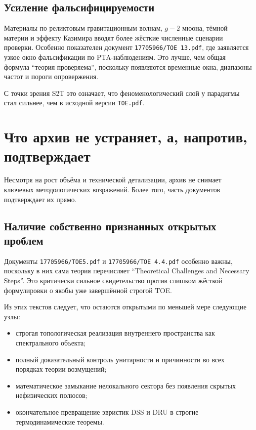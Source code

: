 \documentclass[12pt,a4paper]{article}
\begin{document}
\subsection{Усиление фальсифицируемости}

Материалы по реликтовым гравитационным волнам, \(g-2\) мюона, тёмной материи и эффекту Казимира вводят более жёсткие численные сценарии проверки. Особенно показателен документ \texttt{17705966/ТОЕ 13.pdf}, где заявляется узкое окно фальсификации по PTA-наблюдениям. Это лучше, чем общая формула ``теория проверяема'', поскольку появляются временные окна, диапазоны частот и пороги опровержения.

С точки зрения S2T это означает, что феноменологический слой у парадигмы стал сильнее, чем в исходной версии \texttt{TOE.pdf}.

\section{Что архив не устраняет, а, напротив, подтверждает}

Несмотря на рост объёма и технической детализации, архив не снимает ключевых методологических возражений. Более того, часть документов подтверждает их прямо.

\subsection{Наличие собственно признанных открытых проблем}

Документы \texttt{17705966/TOE5.pdf} и \texttt{17705966/ТОЕ 4.4.pdf} особенно важны, поскольку в них сама теория перечисляет ``Theoretical Challenges and Necessary Steps''. Это критически сильное свидетельство против слишком жёсткой формулировки о якобы уже завершённой строгой TOE.

Из этих текстов следует, что остаются открытыми по меньшей мере следующие узлы:
\begin{itemize}
    \item строгая топологическая реализация внутреннего пространства как спектрального объекта;
    \item полный доказательный контроль унитарности и причинности во всех порядках теории возмущений;
    \item математическое замыкание нелокального сектора без появления скрытых нефизических полюсов;
    \item окончательное превращение эвристик DSS и DRU в строгие термодинамические теоремы.
\end{itemize}
\end{document}
